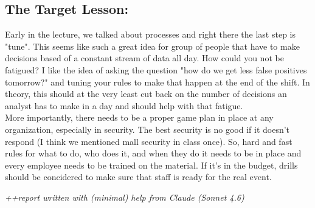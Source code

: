 \documentclass[12pt]{article}
\begin{document}
\subsection{The Target Lesson:}
Early in the lecture, we talked about processes and right there the last step is "tune". This seems like such a great idea for group of people that have to make decisions based of a constant stream of data all day. How could you not be fatigued? I like the idea of asking the question "how do we get less false positives tomorrow?" and tuning your rules to make that happen at the end of the shift. In theory, this should at the very least cut back on the number of decisions an analyst has to make in a day and should help with that fatigue.\\ More importantly, there needs to be a proper game plan in place at any organization, especially in security. The best security is no good if it doesn't respond (I think we mentioned mall security in class once). So, hard and fast rules for what to do, who does it, and when they do it needs to be in place and every employee needs to be trained on the material. If it's in the budget, drills should be concidered to make sure that staff is ready for the real event.

\vfill
\textit{++report written with (minimal) help from Claude (Sonnet 4.6)}
\end{document}
